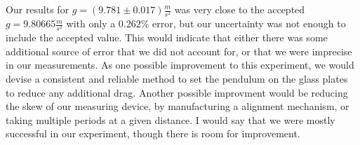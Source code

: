 Our results for $g=(9.781 \pm 0.017)\frac{m}{s^2}$ was very close to the accepted $g=9.80665 \frac{m}{s^2}$ with only a $0.262\%$ error, but our uncertainty was not enough to include the accepted value. This would indicate that either there was some additional source of error that we did not account for, or that we were imprecise in our measurements. As one possible improvement to this experiment, we would devise a consistent and reliable method to set the pendulum on the glass plates to reduce any additional drag. Another possible improvment would be reducing the skew of our measuring device, by manufacturing a alignment mechanism, or taking multiple periods at a given distance. I would say that we were mostly successful in our experiment, though there is room for improvement.
%
%
%
%
%
%
%
